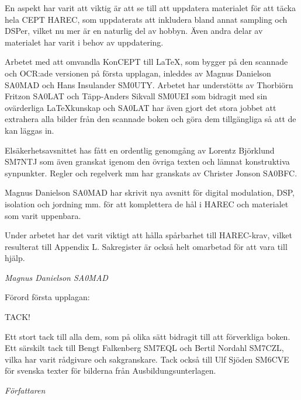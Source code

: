 En aspekt har varit att viktig är att se till att uppdatera materialet för
att täcka hela CEPT HAREC, som uppdaterats att inkludera bland annat sampling
och DSPer, vilket nu mer är en naturlig del av hobbyn. Även andra delar av
materialet har varit i behov av uppdatering.

Arbetet med att omvandla KonCEPT till \LaTeX, som bygger på den scannade och
OCR:ade versionen på första upplagan, inleddes av Magnus Danielson SA0MAD och
Hans Insulander SM0UTY. Arbetet har understötts av Thorbiörn Fritzon SA0LAT och
Täpp-Anders Sikvall SM0UEI som bidragit med sin ovärderliga \LaTeX kunskap och
SA0LAT har även gjort det stora jobbet att extrahera alla bilder från den
scannade boken och göra dem tillgängliga så att de kan läggas in.

Elsäkerhetsavsnittet has fått en ordentlig genomgång av Lorentz Björklund SM7NTJ
som även granskat igenom den övriga texten och lämnat konstruktiva synpunkter.
Regler och regelverk mm har granskats av Christer Jonson SA0BFC.

Magnus Danielson SA0MAD har skrivit nya avsnitt för digital modulation, DSP,
isolation och jordning mm. för att komplettera de hål i HAREC och materialet
som varit uppenbara.

Under arbetet har det varit viktigt att hålla spårbarhet till HAREC-krav,
vilket resulterat till Appendix L. Sakregister är också helt omarbetad för
att vara till hjälp.

\emph{Magnus Danielson SA0MAD}


Förord första upplagan:

TACK!

Ett stort tack till alla dem, som på olika sätt bidragit till att förverkliga
boken. Ett särskilt tack till Bengt Falkenberg SM7EQL och Bertil Nordahl SM7CZL,
vilka har varit rådgivare och sakgranskare. Tack också till Ulf Sjöden SM6CVE
för svenska texter för bilderna från Ausbildungsunterlagen.

\emph{Författaren}

